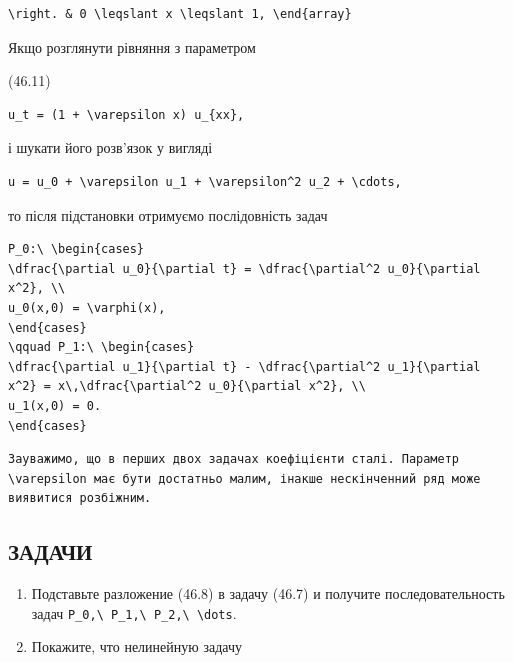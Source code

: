 \documentclass[
  ukrainian,
]{article}
\begin{document}
\begin{verbatim}
\right. & 0 \leqslant x \leqslant 1, \end{array}
\end{verbatim}

Якщо розглянути рівняння з параметром

(46.11)

\begin{verbatim}
u_t = (1 + \varepsilon x) u_{xx},
\end{verbatim}

і шукати його розв'язок у вигляді

\begin{verbatim}
u = u_0 + \varepsilon u_1 + \varepsilon^2 u_2 + \cdots,
\end{verbatim}

то після підстановки отримуємо послідовність задач

\begin{verbatim}
P_0:\ \begin{cases}
\dfrac{\partial u_0}{\partial t} = \dfrac{\partial^2 u_0}{\partial x^2}, \\
u_0(x,0) = \varphi(x),
\end{cases}
\qquad P_1:\ \begin{cases}
\dfrac{\partial u_1}{\partial t} - \dfrac{\partial^2 u_1}{\partial x^2} = x\,\dfrac{\partial^2 u_0}{\partial x^2}, \\
u_1(x,0) = 0.
\end{cases}
\end{verbatim}

\begin{verbatim}
Зауважимо, що в перших двох задачах коефіцієнти сталі. Параметр \varepsilon має бути достатньо малим, інакше нескінченний ряд може виявитися розбіжним.
\end{verbatim}

\subsection{ЗАДАЧИ}\label{ux437ux430ux434ux430ux447ux438}

\begin{enumerate}
\def\labelenumi{\arabic{enumi}.}
\item
  Подставьте разложение (46.8) в задачу (46.7) и получите
  последовательность задач
  \texttt{P\_0,\textbackslash{}\ P\_1,\textbackslash{}\ P\_2,\textbackslash{}\ \textbackslash{}dots}.
\item
  Покажите, что нелинейную задачу
\end{enumerate}
\end{document}
